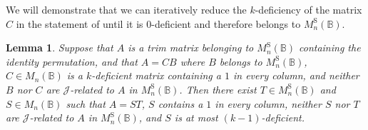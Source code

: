 \documentclass[11pt]{article}
\newtheorem{lemma}[thm]{Lemma}
\numberwithin{equation}{section}
\newcommand{\B}{\mathbb{B}}
\newcommand{\Bn}{M_n(\B)}
\newcommand{\Halln}{M_n^{\text{S}}(\B)}
\newcommand{\J}{\mathscr{J}}
\begin{document}
We will demonstrate that we can iteratively reduce the $k$-deficiency of the
matrix $C$ in the statement of  until it is
$0$-deficient and therefore belongs to $\Halln$.

\begin{lemma}
  Suppose that $A$ is a trim matrix belonging to $\Halln$ containing the
  identity permutation, and that $A = CB$ where $B$ belongs to $\Halln$, $C
  \in \Bn$ is a $k$-deficient matrix containing a $1$ in every column, and
  neither $B$ nor $C$ are $\J$-related to $A$ in $\Halln$. Then there exist $T
  \in \Halln$ and $S \in \Bn$ such that $A = ST$, $S$ contains a $1$ in
  every column, neither $S$ nor $T$ are $\J$-related to $A$ in $\Halln$, and
  $S$ is at most $(k-1)$-deficient.
\end{lemma}
\end{document}
